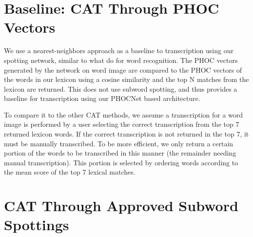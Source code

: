 \documentclass[ms,electronic,twosidetoc,letterpaper,chaptercenter,parttop,lol,lof,lot]{byumsphd}
\begin{document}
\section{Baseline: CAT Through PHOC Vectors}
We use a nearest-neighbors approach as a baseline to transcription using our spotting network, similar to what \cite{krishnan2016} do for word recognition. The PHOC vectors generated by the network on word image are compared to the PHOC vectors of the  words in our lexicon using a cosine similarity and the top N matches from the lexicon are returned. This does not use subword spotting, and thus provides a baseline for transcription using our PHOCNet based architecture.

To compare it to the other CAT methods, we assume a transcription for a word image is performed by a user selecting the correct transcription from the top 7 returned lexicon words. If the correct transcription is not returned in the top 7, it must be manually transcribed.
To be more efficient, we only return a certain portion of the words to be transcribed in this manner (the remainder needing manual transcription). This portion is selected by ordering words according to the mean score of the top 7 lexical matches.







\section{CAT Through Approved Subword Spottings}
\end{document}
